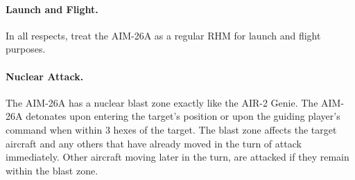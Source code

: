 \paragraph{Launch and Flight.} In all respects, treat the AIM-26A as a regular RHM for launch and flight purposes.

\paragraph{Nuclear Attack.} The AIM-26A has a nuclear blast zone exactly like the AIR-2 Genie. The AIM-26A detonates upon entering the target's position or upon the guiding player's command when within 3 hexes of the target. The blast zone affects the target aircraft and any others that have already moved in the turn of attack immediately. Other aircraft moving later in the turn, are attacked if they remain within the blast zone.
